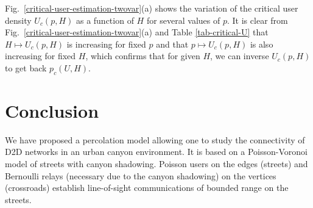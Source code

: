 \documentclass[conference]{IEEEtran}
\begin{document}
\indent Fig.~\ref{critical-user-estimation-twovar}(a) shows the variation of the critical user density $U_c(p,H)$ as a function of $H$ for several values of $p$. It is clear from Fig.~\ref{critical-user-estimation-twovar}(a) and Table \ref{tab-critical-U} that $H \mapsto U_c(p,H)$ is increasing for fixed $p$ and that $p \mapsto U_c(p,H)$ is also increasing for fixed $H$, which confirms that for given $H$, we can inverse $U_c(p,H)$ to get back $p_c(U,H)$.


\section{Conclusion}%
\label{s.Conclusions}
We have proposed a percolation model allowing one to study the connectivity 
of D2D  networks  in an urban canyon environment. It is
based on a  Poisson-Voronoi model of streets with canyon shadowing.
Poisson users on the edges (streets) and Bernoulli relays (necessary due to the canyon shadowing) on the vertices (crossroads) establish  line-of-sight communications of bounded range on the streets.
\end{document}
